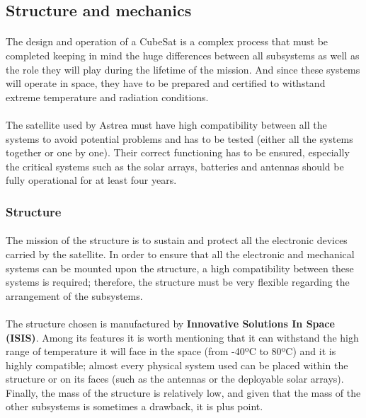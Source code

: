 \subsection{Structure and mechanics}

\paragraph{}The design and operation of a CubeSat is a complex process that must be completed keeping in mind the huge differences between all subsystems as well as the role they will play during the lifetime of the mission. And since these systems will operate in space, they have to be prepared and certified to withstand extreme temperature and radiation conditions.

\paragraph{}The satellite used by Astrea must have high compatibility between all the systems to avoid potential problems and has to be tested (either all the systems together or one by one). Their correct functioning has to be ensured, especially the critical systems such as the solar arrays, batteries and antennas should be fully operational for at least four years.

\subsubsection{Structure}

\paragraph{}The mission of the structure is to sustain and protect all the electronic devices carried by the satellite. In order to ensure that all the electronic and mechanical systems can be mounted upon the structure, a high compatibility between these systems is required; therefore, the structure must be very flexible regarding the arrangement of the subsystems.

\paragraph{}The structure chosen is manufactured by \textbf{Innovative Solutions In Space (ISIS)}. Among its features it is worth mentioning that it can withstand the high range of temperature it will face in the space (from -40ºC to 80ºC) and it is highly compatible; almost every physical system  used can be placed within the structure or on its faces (such as the antennas or the deployable solar arrays). Finally, the mass of the structure is relatively low, and given that the mass of the other subsystems is sometimes a drawback, it is plus point.


